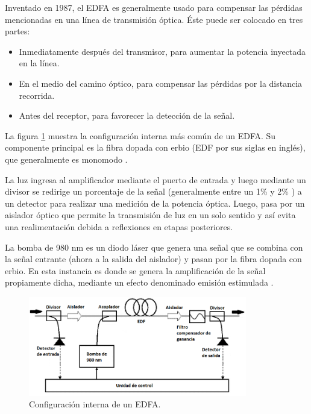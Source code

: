 Inventado en 1987, el EDFA es generalmente usado para compensar las pérdidas mencionadas en una línea de transmisión óptica. Éste puede ser colocado en tres partes: 

\begin{itemize}
\item Inmediatamente después del transmisor, para aumentar la potencia inyectada en la línea.
\item En el medio del camino óptico, para compensar las pérdidas por la distancia recorrida.
\item Antes del receptor, para favorecer la detección de la señal.
\end{itemize}

La figura \ref{fig:EDFAinterno} muestra la configuración interna más común de un EDFA. Su componente principal es la fibra dopada con erbio (EDF por sus siglas en inglés), que generalmente es monomodo \citep{WEBSITE:FIBRA}. 

La luz ingresa al amplificador mediante el puerto de entrada y luego mediante un divisor se redirige un porcentaje de la señal (generalmente entre un 1\% y 2\% \citep{WEBSITE:EDFA2}) a un detector para realizar una medición de la potencia óptica. Luego, pasa por un aislador óptico que permite la transmisión de luz en un solo sentido y así evita una realimentación debida a reflexiones en etapas posteriores.

La bomba de 980 nm es un diodo láser que genera una señal que se combina con la señal entrante (ahora a la salida del aislador) y pasan por la fibra dopada con erbio. En esta instancia es donde se genera la amplificación de la señal propiamente dicha, mediante un efecto denominado emisión estimulada \citep{WEBSITE:EDFA2}\citep{WEBSITE:EMISSION}.

\begin{figure}[H]
\centering
\includegraphics[width=0.85\textwidth]{./Figures/EDFAinterno.png}
\caption{Configuración interna de un EDFA\protect\footnotemark.}
\label{fig:EDFAinterno}
\end{figure}

